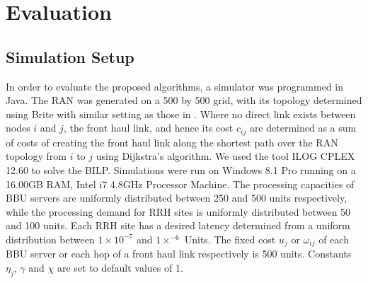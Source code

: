 \documentclass[conference]{IEEEtran}
\begin{document}
\section{Evaluation} \label{eval}
\subsection{Simulation Setup}
In order to evaluate the proposed algorithms, a simulator was programmed in Java. The RAN was generated on a 500 by 500 grid, with its topology determined using Brite with similar setting as those in \cite{rashidpagevine}. Where no direct link exists between nodes $i$ and $j$, the front haul link, and hence its cost $c_{ij}$ are determined as a sum of costs of creating the front haul link along the shortest path over the RAN topology from $i$ to $j$ using Dijkstra's algorithm. We used the tool ILOG CPLEX 12.60 \cite{CPLEX12.6} to solve the BILP. Simulations were run on Windows 8.1 Pro running on a 16.00GB RAM, Intel i7 4.8GHz Processor Machine. The processing capacities of BBU servers are uniformly distributed between 250 and 500 units respectively, while the processing demand for RRH sites is uniformly distributed between 50 and 100 units. Each RRH site has a desired latency determined from a uniform distribution between $1\times 10^{-7}$ and $1\times ^{-6}$ Units. The fixed cost $u_j$ or $\omega_{ij}$ of each BBU server or each hop of a front haul link respectively is 500 units. Constants $\eta_j$, $\gamma$ and $\chi$ are set to default values of 1.
\end{document}
